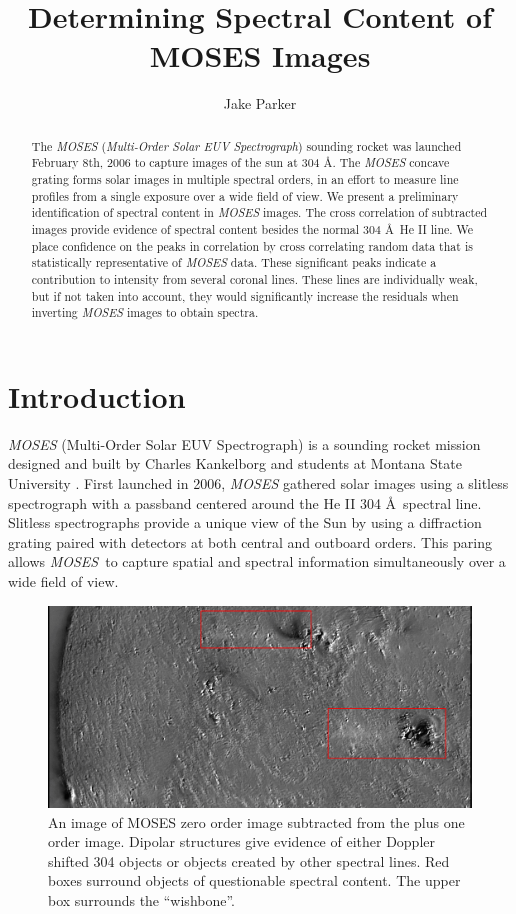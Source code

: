 \documentclass[]{aastex6}
\newcommand{\MOSES}{\textit{MOSES}}
\begin{document}
	\title{Determining Spectral Content of MOSES Images}
	\author{Jake Parker}
	
\begin{abstract}
The \textit{MOSES} (\textit{Multi-Order Solar EUV Spectrograph})  sounding rocket was launched February 8th, 2006 to capture images of the sun at 304 \AA. The \textit{MOSES} concave grating forms solar images in multiple spectral orders, in an effort to measure line profiles from a single exposure over a wide field of view. We present a preliminary identification of spectral content in \textit{MOSES} images. The cross correlation of subtracted images provide evidence of spectral content besides the normal 304 \AA \ He II line. We place confidence on the peaks in correlation by cross correlating random data that is statistically representative of \textit{MOSES} data. These significant peaks indicate a contribution to intensity from several coronal lines.  These lines are individually weak, but if not taken into account, they would significantly increase the residuals when inverting \textit{MOSES} images to obtain spectra.

\end{abstract}

\section{Introduction}

\textit{MOSES} (Multi-Order Solar EUV Spectrograph) is a sounding rocket mission designed and built by Charles Kankelborg and students at Montana State University  \citep{Kan01}.  First launched in 2006, \textit{MOSES} gathered solar images using a slitless spectrograph with a passband centered around the He II 304 \AA \ spectral line.  Slitless spectrographs provide a unique view of the Sun by using a diffraction grating paired with detectors at both central and outboard orders. This paring allows \MOSES \ to capture spatial and spectral information simultaneously over a wide field of view.

\begin{figure}[t]
\centering
\includegraphics[scale=.4]{images/wishbone.png}
\caption{An image of MOSES zero order image subtracted from the plus one order image.  Dipolar structures give evidence of either Doppler shifted 304 objects or objects created by other spectral lines. Red boxes surround objects of questionable spectral content.  The upper box surrounds the ``wishbone''.}
\end{figure}	
\end{document}
